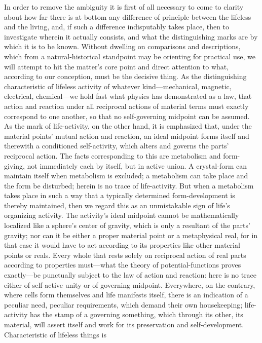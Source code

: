 \documentclass[12pt]{article}
\begin{document}
In order to remove the ambiguity it is first of all necessary to come to
clarity about how far there is at bottom any difference of principle between
the lifeless and the living, and, if such a difference indisputably takes
place, then to investigate wherein it actually consists, and what the
distinguishing marks are by which it is to be known. Without dwelling on
comparisons and descriptions, which from a natural-historical standpoint may
be orienting for practical use, we will attempt to hit the matter's core
point and direct attention to what, according to our conception, must be the
decisive thing. As the distinguishing characteristic of lifeless activity of
whatever kind—mechanical, magnetic, electrical, chemical—we hold fast what
physics has demonstrated as a law, that action and reaction under all
reciprocal actions of material terms must exactly correspond to one another,
so that no self-governing midpoint can be assumed. As the mark of
life-activity, on the other hand, it is emphasized that, under the material
points' mutual action and reaction, an ideal midpoint forms itself and
therewith a conditioned self-activity, which alters and governs the parts'
reciprocal action. The facts corresponding to this are metabolism and
form-giving, not immediately each by itself, but in active union. A
crystal-form can maintain itself when metabolism is excluded; a metabolism
can take place and the form be disturbed; herein is no trace of
life-activity. But when a metabolism takes place in such a way that a
typically determined form-development is thereby maintained, then we regard
this as an unmistakable sign of life's organizing activity. The activity's
ideal midpoint cannot be mathematically localized like a sphere's center of
gravity, which is only a resultant of the parts' gravity; nor can it be
either a proper material point or a metaphysical real, for in that case it
would have to act according to its properties like other material points or
reals. Every whole that rests solely on reciprocal action of real parts
according to properties must—what the theory of potential-functions proves
exactly—be
punctually subject to the law of action and reaction: here is no trace
either of self-active unity or of governing midpoint. Everywhere, on the
contrary, where cells form themselves and life manifests itself, there is an
indication of a peculiar need, peculiar requirements, which demand their own
housekeeping; life-activity has the stamp of a governing something, which
through its other, its material, will assert itself and work for its
preservation and self-development. Characteristic of lifeless things is
\end{document}
